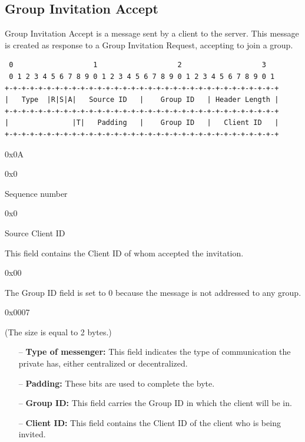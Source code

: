 \documentclass{article}
\begin{document}
\subsection{Group Invitation Accept}
Group Invitation Accept is a message sent by a client to the server. This message is created as response to a Group Invitation Request, accepting to join a group.
\begin{verbatim}  
 0                   1                   2                   3  
 0 1 2 3 4 5 6 7 8 9 0 1 2 3 4 5 6 7 8 9 0 1 2 3 4 5 6 7 8 9 0 1
+-+-+-+-+-+-+-+-+-+-+-+-+-+-+-+-+-+-+-+-+-+-+-+-+-+-+-+-+-+-+-+-+
|   Type  |R|S|A|   Source ID   |    Group ID   | Header Length |
+-+-+-+-+-+-+-+-+-+-+-+-+-+-+-+-+-+-+-+-+-+-+-+-+-+-+-+-+-+-+-+-+
|               |T|   Padding   |    Group ID   |   Client ID   |
+-+-+-+-+-+-+-+-+-+-+-+-+-+-+-+-+-+-+-+-+-+-+-+-+-+-+-+-+-+-+-+-+
\end{verbatim}
\begin{description}[align=left]
    \item [Type:] 0x0A
    
    \item [Reserved:] 0x0
        
    \item [Sequence:] Sequence number
    
    \item [Acknowledgement:] 0x0
     
    \item [Source ID:] Source Client ID
    \begin{flushleft}
        This field contains the Client ID of whom accepted the invitation. 
    \end{flushleft}
    
    \item [Group ID:] 0x00
    \begin{flushleft}
        The Group ID field is set to 0 because the message is not addressed to any group.
    \end{flushleft}
    
    \item [Header Length:] 0x0007

    \item[Options:] (The size is equal to 2 bytes.)
    \begin{itemize}
        \item[--]\textbf{Type of messenger:} This field indicates the type of communication the private has, either centralized or decentralized.
        \item[--]\textbf{Padding:} These bits are used to complete the byte.
        \item[--]\textbf{Group ID:} This field carries the Group ID in which the client will be in. 
        \item[--]\textbf{Client ID:} This field contains the Client ID of the client who is being invited.
    \end{itemize}
\end{description}
\end{document}
